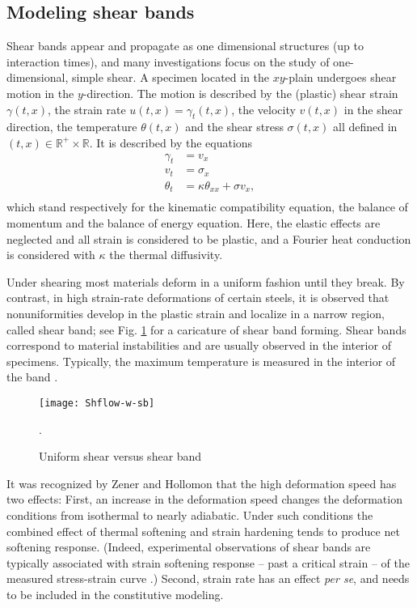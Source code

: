 \documentclass[11pt]{article}
\newcommand{\tcb}{}
\theoremstyle{remark}
\begin{document}
\subsection{Modeling shear bands}
Shear bands appear and propagate as one dimensional structures (up to interaction times), and
many investigations focus on the study of one-dimensional, simple shear.
A specimen located in the $xy$-plain undergoes shear motion in the $y$-direction. The motion is described by the (plastic) shear strain
$\gamma(t,x)$, the strain rate $u(t,x) = \gamma_t (t,x)$, the velocity $v(t,x)$ in the shear direction, the temperature $\theta(t,x)$ and the shear stress
$\sigma (t,x)$ all defined in $(t,x)\in \mathbb{R}^+ \times \mathbb{R}$. It is described by the equations
\begin{equation} \label{mechmodel}
\begin{aligned}
 \gamma_t &= v_x  \\	
  v_t &= \sigma_x
 \\
 \theta_t &= \kappa \theta_{xx} + \sigma v_x, 	\\
\end{aligned}
\end{equation}
which stand respectively for the kinematic compatibility equation, the balance of momentum and
the balance of energy equation. Here, the elastic effects are neglected and all strain is considered to be plastic, and
a Fourier heat conduction is considered with $\kappa$ the thermal diffusivity.


Under shearing most materials deform in a uniform fashion until they break. By contrast, in high strain-rate deformations of
certain steels, it is observed that nonuniformities develop in the  plastic strain and  localize in a narrow region, called shear band; see
 Fig. \ref{ShearFlow} for a caricature of shear band forming.
 \tcb{
 Shear bands correspond to material instabilities and are usually observed in the interior of specimens. Typically, the maximum temperature is measured in the interior of the band \cite{CCHD}.
 }
\begin{figure}
\centering
\vspace{-0.1cm}
\texttt{[image: Shflow-w-sb]}
\vspace{0.1cm}
\caption{Uniform shear versus shear band}.
\label{ShearFlow}
\end{figure}
It was recognized by Zener and Hollomon \cite{ZH} that the  high deformation speed has two effects:
First, an increase in the deformation speed changes the deformation conditions from isothermal
to nearly adiabatic. Under such conditions the combined effect of thermal softening and strain hardening
tends to produce net softening response. (Indeed, experimental observations of shear bands
are  typically associated  with strain softening response -- past a critical strain --
of the measured stress-strain curve \cite{CDHS}.)
Second, strain rate has an effect {\it per se}, and needs to be included in the constitutive modeling.
\end{document}
